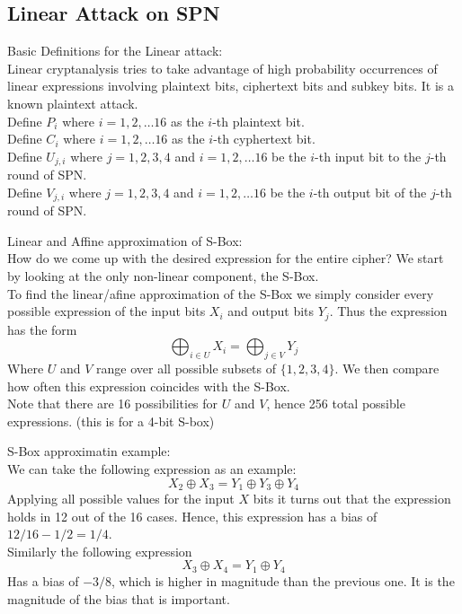 \documentclass[9pt]{beamer}
\begin{document}
\subsection{Linear Attack on SPN}
\begin{frame}
\large{Basic Definitions for the Linear attack:}\\
\vspace{5 mm}
Linear cryptanalysis tries to take advantage of high probability occurrences of  linear expressions involving plaintext bits, ciphertext bits and subkey bits.  It is a known plaintext attack.\\
\vspace{5 mm}
Define $P_i$ where $i = 1, 2, \dots 16$ as the $i$-th plaintext bit.\\
Define $C_i$ where $i = 1, 2, \dots 16$ as the $i$-th cyphertext bit.\\
Define $U_{j,i}$ where $j = 1, 2, 3, 4$ and $i = 1, 2, \dots 16$ be the $i$-th input bit to the $j$-th round of SPN.\\
Define $V_{j,i}$ where $j = 1, 2, 3, 4$ and $i = 1, 2, \dots 16$ be the $i$-th output bit of the $j$-th round of SPN.\\
\end{frame}

\begin{frame}
Linear and Affine approximation of S-Box:\\
\vspace{5mm}
How do we come up with the desired expression for the entire cipher? We start by looking at the only non-linear component, the S-Box.\\
\vspace{5mm}
To find the linear/afine approximation of the S-Box we simply consider every possible expression of the input bits $X_i$ and output bits $Y_j$. Thus the expression has the form
\[ \bigoplus_{i \in U} X_i = \bigoplus_{j \in V} Y_j \]
Where $U$ and $V$ range over all possible subsets of $\{1, 2, 3 ,4\}$. We then compare how often this expression coincides with the S-Box. \\
\vspace{5mm}
Note that there are 16 possibilities for $U$ and $V$, hence 256 total possible expressions. (this is for a 4-bit S-box)
\end{frame}

\begin{frame}
S-Box approximatin example:\\
\vspace{5mm}
We can take the following expression as an example:
\[ X_2 \oplus X_3 = Y_1 \oplus Y_3 \oplus Y_4 \]
Applying all possible values for the input $X$ bits it turns out that the expression holds in 12 out of the 16 cases. Hence, this expression has a bias of $12/16 - 1/2 = 1/4$.\\
\vspace{5mm}
Similarly the following expression
\[ X_3 \oplus X_4 = Y_1 \oplus Y_4 \]
Has a bias of $-3/8$, which is higher in magnitude than the previous one. It is the magnitude of the bias that is important.
\end{frame}
\end{document}
